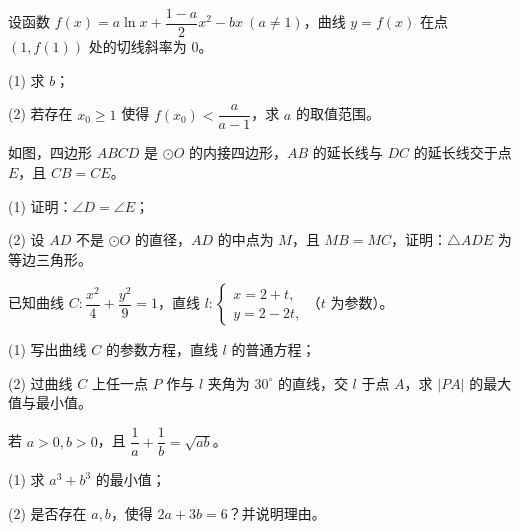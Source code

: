 \begin{question}
设函数 $f(x)=a\ln x+\dfrac{1-a}{2}x^2-bx\ (a\ne1)$，曲线 $y=f(x)$ 在点 $(1,f(1))$ 处的切线斜率为 $0$。

(1) 求 $b$；

(2) 若存在 $x_0\geqslant1$ 使得 $f(x_0)<\dfrac{a}{a-1}$，求 $a$ 的取值范围。

\Needspace{0.4\textheight}
\end{question}
\begin{question}
如图，四边形 $ABCD$ 是 $\odot O$ 的内接四边形，$AB$ 的延长线与 $DC$ 的延长线交于点 $E$，且 $CB=CE$。
\nopagebreak[4]
\begin{center}\end{center}
\nopagebreak[4]
(1) 证明：$\angle D=\angle E$；

(2) 设 $AD$ 不是 $\odot O$ 的直径，$AD$ 的中点为 $M$，且 $MB=MC$，证明：$\triangle ADE$ 为等边三角形。

\end{question}
\begin{question}
已知曲线 $C:\dfrac{x^2}{4}+\dfrac{y^2}{9}=1$，直线 $l:\begin{cases}x=2+t,\\y=2-2t,\end{cases}$（$t$ 为参数）。

(1) 写出曲线 $C$ 的参数方程，直线 $l$ 的普通方程；

(2) 过曲线 $C$ 上任一点 $P$ 作与 $l$ 夹角为 $30^\circ$ 的直线，交 $l$ 于点 $A$，求 $|PA|$ 的最大值与最小值。

\end{question}
\begin{question}
若 $a>0,b>0$，且 $\dfrac1a+\dfrac1b=\sqrt{ab}$。

(1) 求 $a^3+b^3$ 的最小值；

(2) 是否存在 $a,b$，使得 $2a+3b=6$？并说明理由。

\end{question}